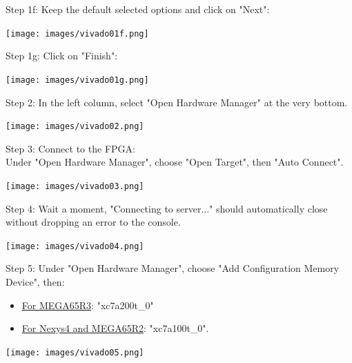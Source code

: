 \vspace{5mm}

\begin{minipage}{\linewidth}
  Step 1f: Keep the default selected options and click on "Next": \\
  \begin{center}
    \texttt{[image: images/vivado01f.png]}
  \end{center}
\end{minipage}

\begin{minipage}{\linewidth}
  Step 1g: Click on "Finish": \\
  \begin{center}
    \texttt{[image: images/vivado01g.png]}
  \end{center}
\end{minipage}

\vspace{5mm}

\begin{minipage}{\linewidth}
  Step 2: In the left column, select "Open Hardware Manager"
  at the very bottom.
  \\
  \begin{center}
    \texttt{[image: images/vivado02.png]}
  \end{center}
\end{minipage}


\begin{minipage}{\linewidth}
  Step 3: Connect to the FPGA: \\
  Under "Open Hardware Manager", choose "Open Target", then "Auto Connect".
  \\
  \begin{center}
    \texttt{[image: images/vivado03.png]}
  \end{center}
\end{minipage}

\vspace{5mm}

\begin{minipage}{\linewidth}
  Step 4: Wait a moment, "Connecting to server..."  should
  automatically close without dropping an error to the console.
  \\
  \begin{center}
    \texttt{[image: images/vivado04.png]}
  \end{center}
\end{minipage}


\begin{minipage}{\linewidth}
  Step 5: Under "Open Hardware Manager", choose "Add Configuration
  Memory Device", then:
  \begin{itemize}
    \item \underline{For MEGA65R3}: "xc7a200t\_0"
    \item \underline{For Nexys4 and MEGA65R2}: "xc7a100t\_0".
  \end{itemize}

  \begin{center}
    \texttt{[image: images/vivado05.png]}
  \end{center}
\end{minipage}

